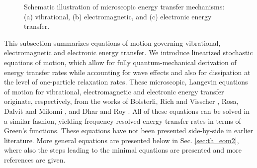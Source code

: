 \begin{figure}
 \begin{center}
 \end{center}
 \caption{Schematic illustration of microscopic energy transfer mechanisms: (a) vibrational, (b) electromagnetic, and (c) electronic energy transfer.}
 \label{fig:mechanisms}
\end{figure}

This subsection summarizes equations of motion governing vibrational, electromagnetic and electronic energy transfer. We introduce linearized stochastic equations of motion, which allow for fully quantum-mechanical derivation of energy transfer rates while accounting for wave effects and also for dissipation at the level of one-particle relaxation rates. These microscopic, Langevin equations of motion for vibrational, electromagnetic and electronic energy transfer originate, respectively, from the works of Bolsterli, Rich and Visscher \cite{bolsterli70}, Rosa, Dalvit and Milonni \cite{rosa10,rosa11}, and Dhar and Roy \cite{dhar03,dhar07}. All of these equations can be solved in a similar fashion, yielding frequency-resolved energy transfer rates in terms of Green's functions. These equations have not been presented side-by-side in earlier literature. More general equations are presented below in Sec. \ref{sec:th_eom2}, where also the steps leading to the minimal equations are presented and more references are given.

